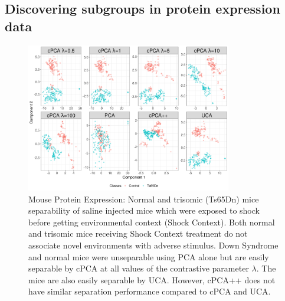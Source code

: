\documentclass[12pt]{article}
\begin{document}
\subsection{\label{sec:mouse}Discovering subgroups in protein expression data}
\begin{figure}[th!]
  \centering
  \includegraphics[width = 0.8\textwidth]{figure/Mouse_Data.png}
  \caption{Mouse Protein Expression: Normal and trisomic (Ts65Dn) mice separability of saline injected mice which were exposed to shock before getting environmental context (Shock Context). Both normal and trisomic mice receiving Shock Context treatment do not associate novel environments with adverse stimulus. Down Syndrome and normal mice were unseparable using PCA alone but are easily separable by cPCA at all values of the contrastive parameter $\lambda$.  The mice are also easily separable by UCA.  However, cPCA++ does not have similar separation performance compared to cPCA and UCA.}
  \label{fig:Mouse}
\end{figure}


\end{document}
